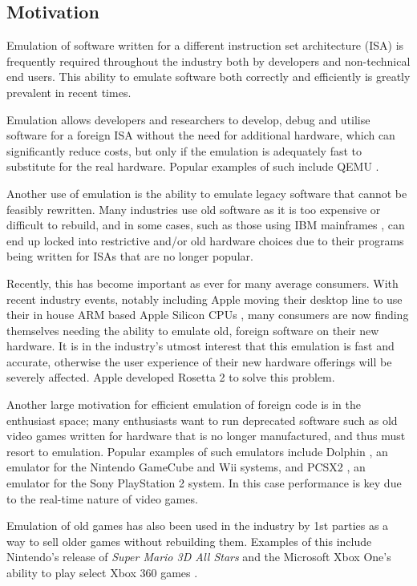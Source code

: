 \subsection{Motivation}

Emulation of software written for a different instruction set architecture (ISA) is frequently required throughout the industry both by developers and non-technical end users. This ability to emulate software both correctly and efficiently is greatly prevalent in recent times.

Emulation allows developers and researchers to develop, debug and utilise software for a foreign ISA without the need for additional hardware, which can significantly reduce costs, but only if the emulation is adequately fast to substitute for the real hardware. Popular examples of such include QEMU \cite{qemu}.

Another use of emulation is the ability to emulate legacy software that cannot be feasibly rewritten. Many industries use old software as it is too expensive or difficult to rebuild, and in some cases, such as those using IBM mainframes \cite{ibm-mainframe}, can end up locked into restrictive and/or old hardware choices due to their programs being written for ISAs that are no longer popular.

Recently, this has become important as ever for many average consumers. With recent industry events, notably including Apple moving their desktop line to use their in house ARM based Apple Silicon CPUs \cite{apple-silicon,rosetta2}, many consumers are now finding themselves needing the ability to emulate old, foreign software on their new hardware. It is in the industry's utmost interest that this emulation is fast and accurate, otherwise the user experience of their new hardware offerings will be severely affected. Apple developed Rosetta 2 \cite{rosetta2} to solve this problem.

Another large motivation for efficient emulation of foreign code is in the enthusiast space; many enthusiasts want to run deprecated software such as old video games written for hardware that is no longer manufactured, and thus must resort to emulation. Popular examples of such emulators include Dolphin \cite{dolphin}, an emulator for the Nintendo GameCube and Wii systems, and PCSX2 \cite{PCSX2}, an emulator for the Sony PlayStation 2 system. In this case performance is key due to the real-time nature of video games.

Emulation of old games has also been used in the industry by 1st parties as a way to sell older games without rebuilding them. Examples of this include Nintendo's release of \emph{Super Mario 3D All Stars} \cite{mario-emulation} and the Microsoft Xbox One's ability to play select Xbox 360 games \cite{xbox360-emulation}.

